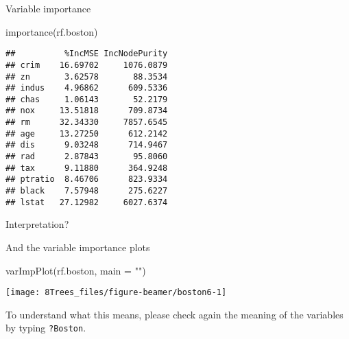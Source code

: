 \documentclass[
  10pt,
  ignorenonframetext,
]{beamer}
\newenvironment{Shaded}{\begin{snugshade}}{\end{snugshade}}
\newcommand{\AttributeTok}[1]{\textcolor[rgb]{0.77,0.63,0.00}{#1}}
\newcommand{\FunctionTok}[1]{\textcolor[rgb]{0.00,0.00,0.00}{#1}}
\newcommand{\NormalTok}[1]{#1}
\newcommand{\StringTok}[1]{\textcolor[rgb]{0.31,0.60,0.02}{#1}}
\begin{document}
\begin{frame}[fragile]
\begin{block}{Variable importance}
\protect\hypertarget{variable-importance}{}
\(~\)

\scriptsize

\begin{Shaded}
\begin{Highlighting}[]
\FunctionTok{importance}\NormalTok{(rf.boston)}
\end{Highlighting}
\end{Shaded}

\begin{verbatim}
##          %IncMSE IncNodePurity
## crim    16.69702     1076.0879
## zn       3.62578       88.3534
## indus    4.96862      609.5336
## chas     1.06143       52.2179
## nox     13.51818      709.8734
## rm      32.34330     7857.6545
## age     13.27250      612.2142
## dis      9.03248      714.9467
## rad      2.87843       95.8060
## tax      9.11880      364.9248
## ptratio  8.46706      823.9334
## black    7.57948      275.6227
## lstat   27.12982     6027.6374
\end{verbatim}

\normalsize

Interpretation?
\end{block}
\end{frame}

\begin{frame}[fragile]
And the variable importance plots

\scriptsize

\begin{Shaded}
\begin{Highlighting}[]
\FunctionTok{varImpPlot}\NormalTok{(rf.boston, }\AttributeTok{main =} \StringTok{""}\NormalTok{)}
\end{Highlighting}
\end{Shaded}

\begin{center}\texttt{[image: 8Trees\_files/figure-beamer/boston6-1]} \end{center}

\normalsize

To understand what this means, please check again the meaning of the
variables by typing \texttt{?Boston}.
\end{frame}
\end{document}
